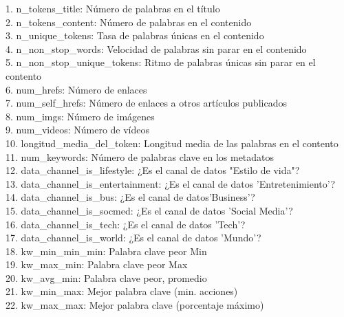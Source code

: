 		1. n\_tokens\_title:               			\hfill Número de palabras en el título \\
		2. n\_tokens\_content:             			\hfill Número de palabras en el contenido \\
		3. n\_unique\_tokens:              			\hfill Tasa de palabras únicas en el contenido \\
		4. n\_non\_stop\_words:             		\hfill Velocidad de palabras sin parar en el contenido \\
		5. n\_non\_stop\_unique\_tokens:     		\hfill Ritmo de palabras únicas sin parar en el contento \\
		6. num\_hrefs:                    			\hfill Número de enlaces \\
		7. num\_self\_hrefs:               			\hfill Número de enlaces a otros artículos publicados \\
		8. num\_imgs:                     			\hfill Número de imágenes \\
		9. num\_videos:                   			\hfill Número de vídeos \\
		10. longitud\_media\_del\_token:         	\hfill Longitud media de las palabras en el contento \\
		11. num\_keywords:                 			\hfill Número de palabras clave en los metadatos \\
		12. data\_channel\_is\_lifestyle:    		\hfill ¿Es el canal de datos "Estilo de vida"? \\
		13. data\_channel\_is\_entertainment:		\hfill ¿Es el canal de datos 'Entretenimiento'? \\
		14. data\_channel\_is\_bus:          		\hfill ¿Es el canal de datos'Business'? \\
		15. data\_channel\_is\_socmed:       		\hfill ¿Es el canal de datos 'Social Media'? \\
		16. data\_channel\_is\_tech:				\hfill ¿Es el canal de datos 'Tech'? \\
		17. data\_channel\_is\_world:        		\hfill ¿Es el canal de datos 'Mundo'? \\
		18. kw\_min\_min\_min:						\hfill Palabra clave peor Min \\
		19. kw\_max\_min: 							\hfill Palabra clave peor Max  \\
		20. kw\_avg\_min: 							\hfill Palabra clave peor, promedio \\
		21. kw\_min\_max:                   		\hfill Mejor palabra clave (min. acciones) \\
		22. kw\_max\_max:                   		\hfill Mejor palabra clave (porcentaje máximo) \\
